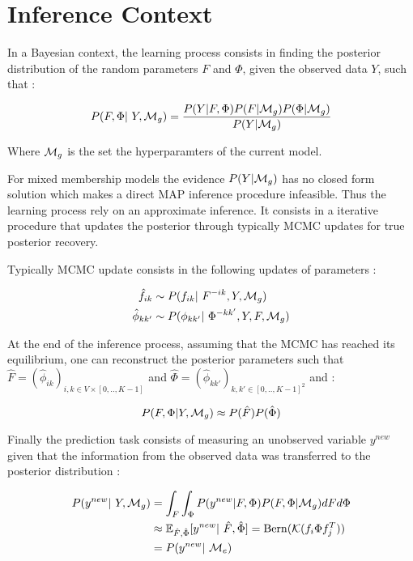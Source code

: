 \section{Inference Context}

In a Bayesian context, the learning process consists in finding the posterior distribution of the random parameters $F$ and $\Phi$, given the observed data $Y$, such that : 

\begin{equation}
    \p(F, \Phi | Y, \mg) = \frac{\p(Y|F,\Phi)\p(F|\mg)\p(\Phi|\mg)}{\p(Y|\mg)}
\end{equation}

Where $\mathcal{M}_g$ is the set the hyperparamters of the current model.


For mixed membership models the evidence $P(Y|\mathcal{M}_g)$ has no closed form solution which makes a direct MAP inference procedure infeasible. Thus the learning process rely on an approximate inference. It consists in a iterative procedure that updates the posterior through typically MCMC updates for true posterior recovery.

Typically MCMC update consists in the following updates of parameters :  

\begin{align}
    \hat f_{ik} &\sim \p(f_{ik} | F^{-ik}, Y, \mg) \\
    \hat \phi_{kk'} &\sim \p(\phi_{kk'} | \Phi^{-kk'}, Y, F, \mg)
\end{align}

At the end of the inference process, assuming that the MCMC has reached its  equilibrium, one can reconstruct the posterior parameters such that $\hat F = (\hat \phi_{ik})_{i,k \in V\times[0,.., K-1]}$ and $\hat \Phi = (\hat \phi_{kk'})_{k,k' \in [0,.., K-1]^2}$ and :

\begin{equation}
    P(F, \Phi|Y, \mathcal{M}_g) \approx P(\hat F) P(\hat \Phi)
\end{equation}

Finally the prediction task consists of measuring an unobserved variable $y^{new}$ given that the information from the observed data was transferred to the posterior distribution : 

\begin{align*}
    \p(y^{new} | Y, \mg) &= \int_F \int_\Phi \p(y^{new}|F,\Phi) \p(F,\Phi|\mg) dF d\Phi \\
                          &\approx \E_{\hat F, \hat \Phi} [y^{new} | \hat F, \hat \Phi] = \mathrm{Bern}(\mathcal{K}(f_i \Phi f_j^T)) \\
                          &= \p(y^{new} | \me)
\end{align*}

